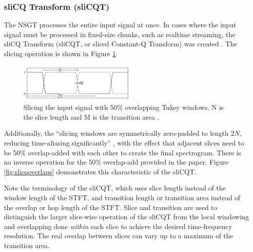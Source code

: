 \documentclass[report.tex]{subfiles}
\begin{document}
\newpagefill

\subsubsection{sliCQ Transform (sliCQT)}
\label{sec:theoryslicqt}

The NSGT processes the entire input signal at once. In cases where the input signal must be processed in fixed-size chunks, such as realtime streaming, the sliCQ Transform (sliCQT, or sliced Constant-Q Transform) was created \parencite{invertiblecqt, slicq}. The slicing operation is shown in Figure \ref{fig:slicqtukeys}.

\begin{figure}[ht]
	\centering
	\includegraphics[width=0.5156\textwidth]{./images-misc/slicq_windows.png}
	\caption{Slicing the input signal with 50\% overlapping Tukey windows. N is the slice length and M is the transition area \parencite{slicq}.}
	\label{fig:slicqtukeys}
\end{figure}

Additionally, the ``slicing windows are symmetrically zero-padded to length $2N$, reducing time-aliasing significantly'' \parencite[10]{slicq}, with the effect that adjacent slices need to be 50\% overlap-added with each other to create the final spectrogram. There is no inverse operation for the 50\% overlap-add provided in the paper. Figure \ref{fig:slicqoverlaps} demonstrates this characteristic of the sliCQT.

Note the terminology of the sliCQT, which uses slice length instead of the window length of the STFT, and transition length or transition area instead of the overlap or hop length of the STFT. Slice and transition are used to distinguish the larger slice-wise operation of the sliCQT from the local windowing and overlapping done \textit{within} each slice to achieve the desired time-frequency resolution. The real overlap between slices can vary up to a maximum of the transition area.
\end{document}

